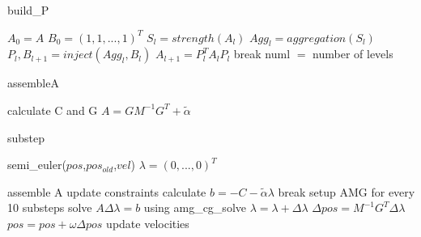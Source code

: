 \documentclass{article}
\begin{document}
\begin{algorithm}
    \begin{algorithmic}[1]
    \caption{build\_P}
    \label{algo:build_P}
    \State $A_0 = A$
    \State $B_0 = (1,1,...,1)^T$
        \State $S_{l} = strength(A_{l})$
        \State $Agg_{l} = aggregation(S_{l})$
        \State $P_{l},B_{l+1} = inject(Agg_{l},B_{l})$
        \State $A_{l+1} = P_{l}^T A_{l} P_{l}$
            \State break
        \EndIf
    \EndFor
    \State numl $=$ number of levels
\end{algorithmic}
\end{algorithm}



\begin{algorithm}
    \begin{algorithmic}[1]
    \caption{assembleA}
    \label{algo:assembleA}
    \State calculate C and  G 
    \State $A = G M^{-1} G^T + \tilde\alpha$
\end{algorithmic}
\end{algorithm}



\begin{algorithm}
    \begin{algorithmic}[1]
    \caption{substep}
    \label{algo:substep}
    \State semi\_euler($pos$,$pos_{old}$,$vel$)
    \State $\lambda=(0,...,0)^T$
    
        \State assemble A
        \State update constraints
        \State calculate $b = - C - \tilde\alpha \lambda$
            \State break
        \EndIf
        \State setup AMG for every 10 substeps
        \State solve $A \Delta\lambda = b$ using amg\_cg\_solve
        \State $\lambda = \lambda + \Delta\lambda$
        \State $\Delta pos = M^{-1} G^T \Delta\lambda$
        \State $pos = pos + \omega \Delta pos$
    \EndFor
    \State update velocities
\end{algorithmic}
\end{algorithm}
\end{document}
